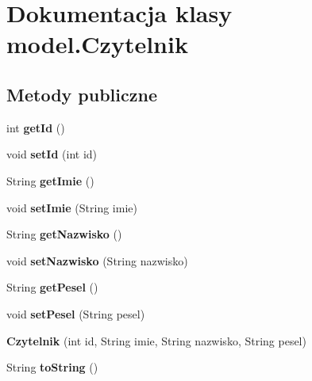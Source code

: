 \hypertarget{classmodel_1_1_czytelnik}{}\section{Dokumentacja klasy model.\+Czytelnik}
\label{classmodel_1_1_czytelnik}
\subsection*{Metody publiczne}
\begin{DoxyCompactItemize}
\item 
\hypertarget{classmodel_1_1_czytelnik_a350c5cbcc8ed36a73b64ae53d9bed261}{}int {\bfseries get\+Id} ()\label{classmodel_1_1_czytelnik_a350c5cbcc8ed36a73b64ae53d9bed261}

\item 
\hypertarget{classmodel_1_1_czytelnik_abb528a96cc894cbc16184453b3687200}{}void {\bfseries set\+Id} (int id)\label{classmodel_1_1_czytelnik_abb528a96cc894cbc16184453b3687200}

\item 
\hypertarget{classmodel_1_1_czytelnik_a0901e0710b3eac9be263fe0b9fc4ee28}{}String {\bfseries get\+Imie} ()\label{classmodel_1_1_czytelnik_a0901e0710b3eac9be263fe0b9fc4ee28}

\item 
\hypertarget{classmodel_1_1_czytelnik_aaf30f5f126f186d3505b1ff4e722c586}{}void {\bfseries set\+Imie} (String imie)\label{classmodel_1_1_czytelnik_aaf30f5f126f186d3505b1ff4e722c586}

\item 
\hypertarget{classmodel_1_1_czytelnik_a47ef0cd71c0e198b89b1bb2b4ceff75e}{}String {\bfseries get\+Nazwisko} ()\label{classmodel_1_1_czytelnik_a47ef0cd71c0e198b89b1bb2b4ceff75e}

\item 
\hypertarget{classmodel_1_1_czytelnik_ab14283d96648d14ea23db6be3be56540}{}void {\bfseries set\+Nazwisko} (String nazwisko)\label{classmodel_1_1_czytelnik_ab14283d96648d14ea23db6be3be56540}

\item 
\hypertarget{classmodel_1_1_czytelnik_a9a682c40c4310a06b532357a979a9c41}{}String {\bfseries get\+Pesel} ()\label{classmodel_1_1_czytelnik_a9a682c40c4310a06b532357a979a9c41}

\item 
\hypertarget{classmodel_1_1_czytelnik_a545b138589f94038b09dce5e55b2b78b}{}void {\bfseries set\+Pesel} (String pesel)\label{classmodel_1_1_czytelnik_a545b138589f94038b09dce5e55b2b78b}

\item 
\hypertarget{classmodel_1_1_czytelnik_a46e86f825bde67387bf61b10893db16d}{}{\bfseries Czytelnik} (int id, String imie, String nazwisko, String pesel)\label{classmodel_1_1_czytelnik_a46e86f825bde67387bf61b10893db16d}

\item 
\hypertarget{classmodel_1_1_czytelnik_afdcdd5b3496717892836107722b287b2}{}String {\bfseries to\+String} ()\label{classmodel_1_1_czytelnik_afdcdd5b3496717892836107722b287b2}

\end{DoxyCompactItemize}


